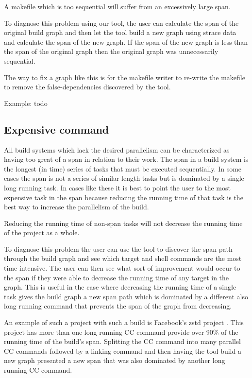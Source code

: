 \documentclass[twocolumn,sigplan,10pt,review]{acmart}
\begin{document}
A makefile which is too sequential will suffer from an excessively large span.

To diagnose this problem using our tool, the user can calculate the span of the original build
graph and then let the tool build a new graph using strace data and calculate the span of the
new graph.  If the span of the new graph is less than the span of the original graph then the
original graph was unnecessarily sequential.

The way to fix a graph like this is for the makefile writer to re-write the makefile to
remove the false-dependencies discovered by the tool.

Example: todo

\subsection{Expensive command}

All build systems which lack the desired parallelism can be characterized as having too great of
a span in relation to their work.  The span in a build system is the longest (in time) series of
tasks that must be executed sequentially.  In some cases the span is not a series of similar length
tasks but is dominated by a single long running task.  In cases like these it is best to point the
user to the most expensive task in the span because reducing the running time of that task is the
best way to increase the parallelism of the build.

Reducing the running time of non-span tasks will not decrease the running time of the project as
a whole.

To diagnose this problem the user can use the tool to discover the span path through the build
graph and see which target and shell commands are the most time intensive.  The user can then see
what sort of improvement would occur to the span if they were able to decrease the running
time of any target in the graph.  This is useful in the case where decreasing the running time
of a single task gives the build graph a new span path which is dominated by a different also
long running command that prevents the span of the graph from decreasing.

An example of such a project with such a build is Facebook's zstd project \cite{}.  This project
has more than one long running CC command provide over 90\% of the running time of the build's
span.  Splitting the CC command into many parallel CC commands followed by a linking command
and then having the tool build a new graph presented a new span that was also dominated by
another long running CC command.
\end{document}
